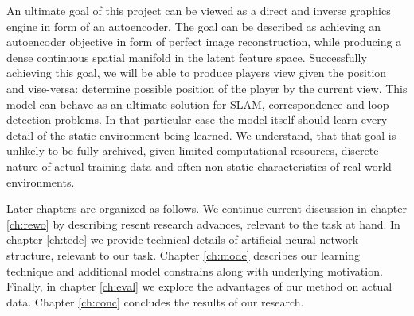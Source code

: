 An ultimate goal of this project can be viewed as a direct and inverse graphics engine in form of an autoencoder.
The goal can be described as achieving an autoencoder objective in form of perfect image reconstruction, while producing a dense continuous spatial manifold in the latent feature space.
Successfully achieving this goal, we will be able to produce players view given the position and vise-versa: determine possible position of the player by the current view.
This model can behave as an ultimate solution for SLAM, correspondence and loop detection problems.
In that particular case the model itself should learn every detail of the static environment being learned.
We understand, that that goal is unlikely to be fully archived, given limited computational resources, discrete nature of actual training data and often non-static characteristics of real-world environments.

Later chapters are organized as follows.
We continue current discussion in chapter \ref{ch:rewo} by describing resent research advances, relevant to the task at hand.
In chapter \ref{ch:tede} we provide technical details of artificial neural network structure, relevant to our task.
Chapter \ref{ch:mode} describes our learning technique and additional model constrains along with underlying motivation.
Finally, in chapter \ref{ch:eval} we explore the advantages of our method on actual data.
Chapter \ref{ch:conc} concludes the results of our research.
